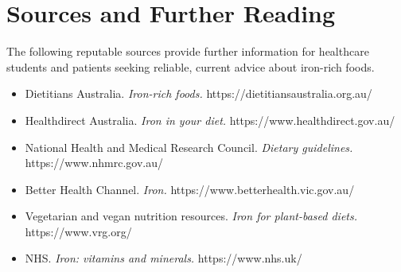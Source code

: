 \section*{Sources and Further Reading}
The following reputable sources provide further information for healthcare students and patients seeking reliable, current advice about iron-rich foods.
\begin{itemize}
    \item Dietitians Australia. \textit{Iron-rich foods.} https://dietitiansaustralia.org.au/
    \item Healthdirect Australia. \textit{Iron in your diet.} https://www.healthdirect.gov.au/
    \item National Health and Medical Research Council. \textit{Dietary guidelines.} https://www.nhmrc.gov.au/
    \item Better Health Channel. \textit{Iron.} https://www.betterhealth.vic.gov.au/
    \item Vegetarian and vegan nutrition resources. \textit{Iron for plant-based diets.} https://www.vrg.org/
    \item NHS. \textit{Iron: vitamins and minerals.} https://www.nhs.uk/
\end{itemize}
